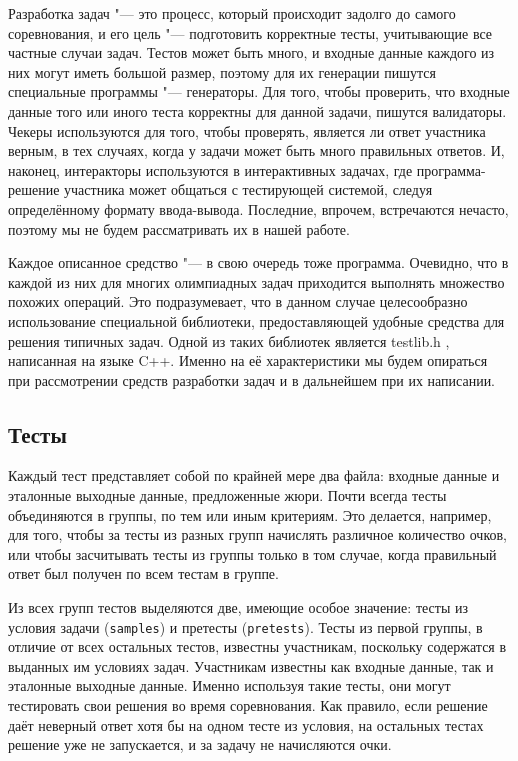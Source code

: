Разработка задач "--- это процесс, который происходит задолго до самого соревнования, и его цель "--- подготовить корректные тесты, учитывающие все частные случаи задач. Тестов может быть много, и входные данные каждого из них могут иметь большой размер, поэтому для их генерации пишутся специальные программы "--- генераторы. Для того, чтобы проверить, что входные данные того или иного теста корректны для данной задачи, пишутся валидаторы. Чекеры используются для того, чтобы проверять, является ли ответ участника верным, в тех случаях, когда у задачи может быть много правильных ответов. И, наконец, интеракторы используются в интерактивных задачах, где программа-решение участника может общаться с тестирующей системой, следуя определённому формату ввода-вывода. Последние, впрочем, встречаются нечасто, поэтому мы не будем рассматривать их в нашей работе.

Каждое описанное средство "--- в свою очередь тоже программа. Очевидно, что в каждой из них для многих олимпиадных задач приходится выполнять множество похожих операций. Это подразумевает, что в данном случае целесообразно использование специальной библиотеки, предоставляющей удобные средства для решения типичных задач. Одной из таких библиотек является testlib.h \cite{testlib}, написанная на языке C++. Именно на её характеристики мы будем опираться при рассмотрении средств разработки задач и в дальнейшем при их написании.

\subsection{Тесты}

Каждый тест представляет собой по крайней мере два файла: входные данные и эталонные выходные данные, предложенные жюри. Почти всегда тесты объединяются в группы, по тем или иным критериям. Это делается, например, для того, чтобы за тесты из разных групп начислять различное количество очков, или чтобы засчитывать тесты из группы только в том случае, когда правильный ответ был получен по всем тестам в группе.

Из всех групп тестов выделяются две, имеющие особое значение: тесты из условия задачи (\texttt{samples}) и претесты (\texttt{pretests}). Тесты из первой группы, в отличие от всех остальных тестов, известны участникам, поскольку содержатся в выданных им условиях задач. Участникам известны как входные данные, так и эталонные выходные данные. Именно используя такие тесты, они могут тестировать свои решения во время соревнования. Как правило, если решение даёт неверный ответ хотя бы на одном тесте из условия, на остальных тестах решение уже не запускается, и за задачу не начисляются очки.

